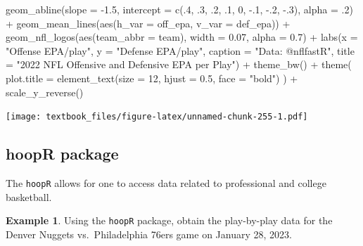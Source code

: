 \documentclass[
  11pt,
]{book}
\newenvironment{Shaded}{\begin{snugshade}}{\end{snugshade}}
\newcommand{\AttributeTok}[1]{\textcolor[rgb]{0.77,0.63,0.00}{#1}}
\newcommand{\DecValTok}[1]{\textcolor[rgb]{0.00,0.00,0.81}{#1}}
\newcommand{\FloatTok}[1]{\textcolor[rgb]{0.00,0.00,0.81}{#1}}
\newcommand{\FunctionTok}[1]{\textcolor[rgb]{0.00,0.00,0.00}{#1}}
\newcommand{\NormalTok}[1]{#1}
\newcommand{\SpecialCharTok}[1]{\textcolor[rgb]{0.00,0.00,0.00}{#1}}
\newcommand{\StringTok}[1]{\textcolor[rgb]{0.31,0.60,0.02}{#1}}
\theoremstyle{definition}
\theoremstyle{definition}
\newtheorem{example}{Example}[chapter]
\theoremstyle{definition}
\theoremstyle{definition}
\theoremstyle{remark}
\begin{document}
\begin{Shaded}
\begin{Highlighting}[]
  \FunctionTok{geom\_abline}\NormalTok{(}\AttributeTok{slope =} \SpecialCharTok{{-}}\FloatTok{1.5}\NormalTok{, }\AttributeTok{intercept =} \FunctionTok{c}\NormalTok{(.}\DecValTok{4}\NormalTok{, .}\DecValTok{3}\NormalTok{, .}\DecValTok{2}\NormalTok{, .}\DecValTok{1}\NormalTok{, }\DecValTok{0}\NormalTok{, }\SpecialCharTok{{-}}\NormalTok{.}\DecValTok{1}\NormalTok{, }\SpecialCharTok{{-}}\NormalTok{.}\DecValTok{2}\NormalTok{, }\SpecialCharTok{{-}}\NormalTok{.}\DecValTok{3}\NormalTok{), }\AttributeTok{alpha =}\NormalTok{ .}\DecValTok{2}\NormalTok{) }\SpecialCharTok{+}
  \FunctionTok{geom\_mean\_lines}\NormalTok{(}\FunctionTok{aes}\NormalTok{(}\AttributeTok{h\_var =}\NormalTok{ off\_epa, }\AttributeTok{v\_var =}\NormalTok{ def\_epa)) }\SpecialCharTok{+}
  \FunctionTok{geom\_nfl\_logos}\NormalTok{(}\FunctionTok{aes}\NormalTok{(}\AttributeTok{team\_abbr =}\NormalTok{ team), }\AttributeTok{width =} \FloatTok{0.07}\NormalTok{, }\AttributeTok{alpha =} \FloatTok{0.7}\NormalTok{) }\SpecialCharTok{+}
  \FunctionTok{labs}\NormalTok{(}\AttributeTok{x =} \StringTok{"Offense EPA/play"}\NormalTok{, }\AttributeTok{y =} \StringTok{"Defense EPA/play"}\NormalTok{, }\AttributeTok{caption =} \StringTok{"Data: @nflfastR"}\NormalTok{,}
    \AttributeTok{title =} \StringTok{"2022 NFL Offensive and Defensive EPA per Play"}\NormalTok{) }\SpecialCharTok{+}
  \FunctionTok{theme\_bw}\NormalTok{() }\SpecialCharTok{+}
  \FunctionTok{theme}\NormalTok{( }\AttributeTok{plot.title =} \FunctionTok{element\_text}\NormalTok{(}\AttributeTok{size =} \DecValTok{12}\NormalTok{, }\AttributeTok{hjust =} \FloatTok{0.5}\NormalTok{, }\AttributeTok{face =} \StringTok{"bold"}\NormalTok{) ) }\SpecialCharTok{+}
  \FunctionTok{scale\_y\_reverse}\NormalTok{()}
\end{Highlighting}
\end{Shaded}

\texttt{[image: textbook\_files/figure-latex/unnamed-chunk-255-1.pdf]}

\newpage

\hypertarget{hoopr-package}{%
\subsection{hoopR package}\label{hoopr-package}}

The \texttt{hoopR} allows for one to access data related to professional and college basketball.

\begin{example}
Using the \texttt{hoopR} package, obtain the play-by-play data for the Denver Nuggets vs.~Philadelphia 76ers game on January 28, 2023.
\end{example}
\end{document}
